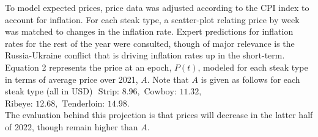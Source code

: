 \documentclass[12pt,a4paper]{article}
\begin{document}
To model expected prices, price data was adjusted according to the CPI index to account for inflation. For each steak type, a scatter-plot relating price by week was matched to changes in the inflation rate. Expert predictions for inflation rates for the rest of the year were consulted, though of major relevance is the Russia-Ukraine conflict that is driving inflation rates up in the short-term. Equation 2 represents the price at an epoch, $P(t)$, modeled for each steak type in terms of average price over 2021, $A$. 
Note that $A$ is given as follows for each steak type (all in USD) $\text{ Strip: } 8.96, \text{ Cowboy: } 11.32,$ $\text{Ribeye: } 12.68, \text{ Tenderloin: } 14.98.$
\\

The evaluation behind this projection is that prices will decrease in the latter half of 2022, though remain higher than $A$. 

\newpage
\end{document}
